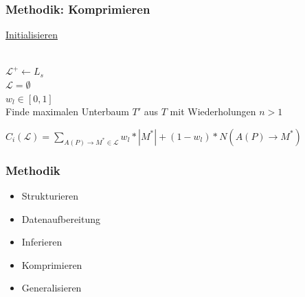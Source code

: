 \documentclass[12pt]{beamer}
\begin{document}
    \begin{frame}[allowframebreaks]
        \frametitle{Methodik: Komprimieren}

        \underline{Initialisieren}\\
        ~\\
        \begin{algorithm}[H]
            $\mathcal{L}^+ \leftarrow L_s$\\
            $\mathcal{L}=\emptyset$\\
            $w_l \in [0,1]$\\
            Finde maximalen Unterbaum $T'$ aus $T$ mit Wiederholungen $n>1$
        \end{algorithm}

        \framebreak

        \begin{algorithm}[H]
        \end{algorithm}

        \framebreak

        \begin{algorithm}[H]
            \centering
            $C_i(\mathcal{L})= \sum\limits_{A(P) \rightarrow M^* \in \mathcal{L}} w_l * |M^*| + (1 - w_l) * N(A(P)\rightarrow M^*)$
        \end{algorithm}
    \end{frame}

    \begin{frame}
        \frametitle{Methodik}

        \begin{itemize}
            \setlength\itemsep{1em}
            \item<1-> Strukturieren
            \item<1-> Datenaufbereitung
            \item<1-> Inferieren
            \item<1-> Komprimieren
            \item<2-> Generalisieren
        \end{itemize}
    \end{frame}
\end{document}
